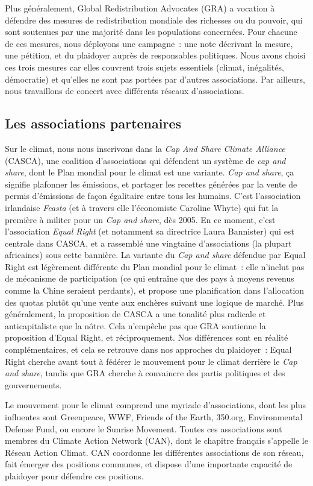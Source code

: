 \documentclass[a5paper,french]{memoir}
\begin{document}
Plus généralement, Global Redistribution Advocates (GRA) a vocation à défendre des mesures de redistribution mondiale des richesses ou du pouvoir, qui sont soutenues par une majorité dans les populations concernées. Pour chacune de ces mesures, nous déployons une campagne~: une note décrivant la mesure, une pétition, et du plaidoyer auprès de responsables politiques. Nous avons choisi ces trois mesures car elles couvrent trois sujets essentiels (climat, inégalités, démocratie) et qu'elles ne sont pas portées par d'autres associations. Par ailleurs, nous travaillons de concert avec différents réseaux d'associations. 

\subsection{Les associations partenaires}

Sur le climat, nous nous inscrivons dans la \textit{Cap And Share Climate Alliance} (CASCA), une coalition d'associations qui défendent un système de \textit{cap and share}, dont le Plan mondial pour le climat est une variante. \textit{Cap and share}, ça signifie plafonner les émissions, et partager les recettes générées par la vente de permis d'émissions de façon égalitaire entre tous les humains. C'est l'association irlandaise \textit{Feasta} (et à travers elle l'économiste Caroline Whyte) qui fut la première à militer pour un \textit{Cap and share}, dès 2005. En ce moment, c'est l'association \textit{Equal Right} (et notamment sa directrice Laura Bannister) qui est centrale dans CASCA, et a rassemblé une vingtaine d'associations (la plupart africaines) sous cette bannière. La variante du \textit{Cap and share} défendue par Equal Right est légèrement différente du Plan mondial pour le climat~: elle n'inclut pas de mécanisme de participation (ce qui entraîne que des pays à moyens revenus comme la Chine seraient perdants), et propose une planification dans l'allocation des quotas plutôt qu'une vente aux enchères suivant une logique de marché. Plus généralement, la proposition de CASCA a une tonalité plus radicale et anticapitaliste que la nôtre. Cela n'empêche pas que GRA soutienne la proposition d'Equal Right, et réciproquement. Nos différences sont en réalité complémentaires, et cela se retrouve dans nos approches du plaidoyer~: Equal Right cherche avant tout à fédérer le mouvement pour le climat derrière le \textit{Cap and share}, tandis que GRA cherche à convaincre des partis politiques et des gouvernements. 

Le mouvement pour le climat comprend une myriade d'associations, dont les plus influentes sont Greenpeace, WWF, Friends of the Earth, 350.org, Environmental Defense Fund, ou encore le Sunrise Movement. Toutes ces associations sont membres du Climate Action Network (CAN), dont le chapitre français s'appelle le Réseau Action Climat. CAN coordonne les différentes associations de son réseau, fait émerger des positions communes, et dispose d'une importante capacité de plaidoyer pour défendre ces positions. 
\end{document}
